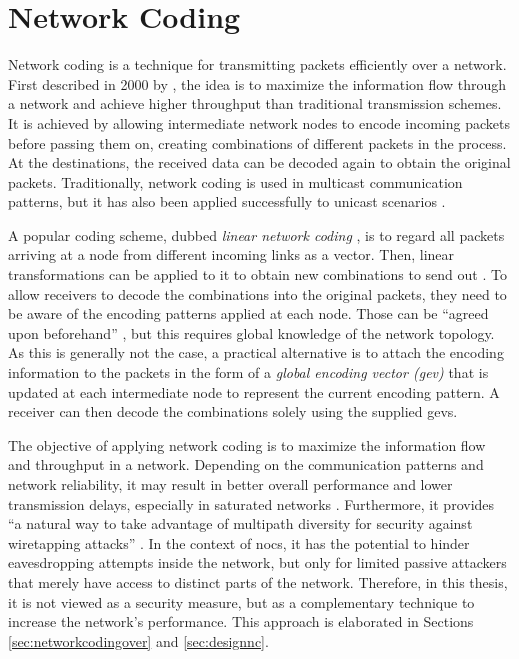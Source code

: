 \section{Network Coding}\label{sec:networkcodingfun}
Network coding is a technique for transmitting packets efficiently over a network. First described in 2000 by \citeauthor{ahlswede00networkflow}
\cite{ahlswede00networkflow}, the idea is to maximize the information flow through a network and achieve higher throughput than traditional transmission
schemes. It is achieved by allowing intermediate network nodes to encode incoming packets before passing them on, creating combinations of different
packets in the process. At the destinations, the received data can be decoded again to obtain the original packets. Traditionally, network coding is
used in multicast communication patterns, but it has also been applied successfully to unicast scenarios \cite[e.g.][]{moriam15manycorenc}.

A popular coding scheme, dubbed \textit{linear network coding} \cite{li03linearnc}, is to regard all packets arriving at a node from different incoming links as a vector.
Then, linear transformations can be applied to it to obtain new combinations to send out \cite[1]{li03linearnc}. To allow receivers to decode the
combinations into the original packets, they need to be aware of the encoding patterns applied at each node. Those can be \enquote{agreed upon
beforehand} \cite[1]{li03linearnc}, but this requires global knowledge of the network topology. As this is generally not the case, a practical
alternative is to attach the encoding information to the packets in the form of a \textit{global encoding vector (\gls{gev})}
\cites[2\psqq]{chou03practicalnc}[5\psq]{chou07ncforinternetandwireless} that is updated at each intermediate node to represent the current encoding
pattern. A receiver can then decode the combinations solely using the supplied \glspl{gev}.

The objective of applying network coding is to maximize the information flow and throughput in a network. Depending on the communication patterns and
network reliability, it may result in better overall performance and lower transmission delays, especially in saturated networks
\cite[7]{duongba11ncinmulticore}. Furthermore, it provides \enquote{a natural way to take advantage of multipath diversity for security against
wiretapping attacks} \cite[8]{fragouli07ncfundamentals}. In the context of \glspl{noc}, it has the potential to hinder eavesdropping attempts inside
the network, but only for limited passive attackers that merely have access to distinct parts of the network. Therefore, in this thesis, it is not
viewed as a security measure, but as a complementary technique to increase the network's performance. This approach is elaborated in Sections
\ref{sec:networkcodingover} and \ref{sec:designnc}.
